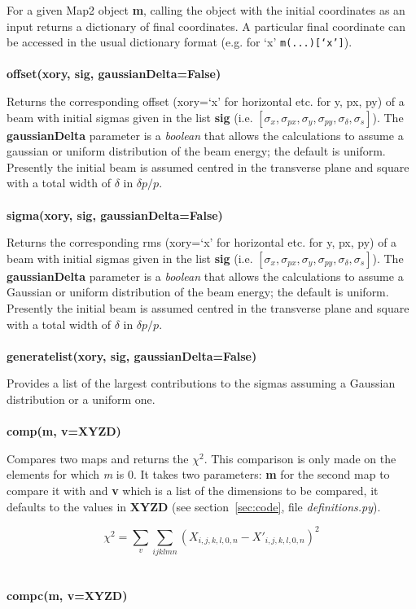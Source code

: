 \documentclass[a4paper]{cernatsnote}
\begin{document}
For a given Map2 object \textbf{m}, calling the object with the
initial coordinates as an input returns a dictionary of final
coordinates. A particular final coordinate can be accessed in the
usual dictionary format (e.g. for `x' \texttt{m(...)[`x']}).
\\\\
\textbf{offset(xory, sig, gaussianDelta=False)}

Returns the corresponding offset (xory=`x' for horizontal etc. for y,
px, py) of a beam with initial sigmas given in the list \textbf{sig}
(i.e. $[\sigma_x, \sigma_{px}, \sigma_y, \sigma_{py}, \sigma_\delta,
  \sigma_s]$). The \textbf{gaussianDelta} parameter is a
\textit{boolean} that allows the calculations to assume a gaussian or
uniform distribution of the beam energy; the default is uniform.
Presently the initial beam is assumed centred in the transverse plane
and square with a total width of $\delta$ in $\delta p/p$.
\\\\
\textbf{sigma(xory, sig, gaussianDelta=False)}

Returns the corresponding rms (xory=`x' for horizontal etc. for y,
px, py) of a beam with initial sigmas given in the list \textbf{sig}
(i.e. $[\sigma_x, \sigma_{px}, \sigma_y, \sigma_{py}, \sigma_\delta,
  \sigma_s]$). The \textbf{gaussianDelta} parameter is a
\textit{boolean} that allows the calculations to assume a Gaussian or
uniform distribution of the beam energy; the default is uniform.
Presently the initial beam is assumed centred in the transverse plane
and square with a total width of $\delta$ in $\delta p/p$.
\\\\
\textbf{generatelist(xory, sig, gaussianDelta=False)}

Provides a list of the largest contributions to the sigmas assuming a
Gaussian distribution or a uniform one.
\\\\
\textbf{comp(m, v=XYZD)}

Compares two maps and returns the $\chi^2$. This comparison is only
made on the elements for which \textit{m} is 0. It takes two parameters:
\textbf{m} for the second map to compare it with and \textbf{v} which
is a list of the dimensions to be compared, it defaults to the values
in \textbf{XYZD} (see section~\ref{sec:code}, file
\textit{definitions.py}).

\[\chi^2 = \sum_{v} \sum_{ijklmn} \left(X_{i,j,k,l,0,n} - X'_{i,j,k,l,0,n} \right)^2\]
\\\\
\textbf{compc(m, v=XYZD)}
\end{document}
